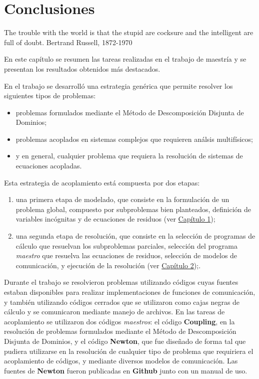 \chapter{Conclusiones}
\label{conclusiones}
\chapterquote
{The trouble with the world is that the stupid are cocksure and the intelligent are full of doubt.}
{Bertrand Russell, 1872-1970}

En este capítulo se resumen las tareas realizadas en el trabajo de maestría y se presentan los resultados obtenidos más destacados.

En el trabajo se desarrolló una estrategia genérica que permite resolver los siguientes tipos de problemas:
\begin{itemize}
\item problemas formulados mediante el Método de Descomposición Disjunta de Dominios;
\item problemas acoplados en sistemas complejos que requieren análsis multifísicos;
\item y en general, cualquier problema que requiera la resolución de sistemas de ecuaciones acopladas.
\end{itemize}
Esta estrategia de acoplamiento está compuesta por dos etapas:
\begin{enumerate}
\item una primera etapa de modelado, que consiste en la formulación de un problema global, compuesto por subproblemas bien planteados, definición de variables incógnitas y de ecuaciones de residuos (ver \hyperlink{chapter.1}{Capítulo 1});
\item una segunda etapa de resolución, que consiste en la selección de programas de cálculo que resuelvan los subproblemas parciales,
selección del programa \textit{maestro} que resuelva las ecuaciones de residuos, selección de modelos de comunicación, y ejecución de la resolución (ver \hyperlink{chapter.2}{Capítulo 2});.
\end{enumerate}

Durante el trabajo se resolvieron problemas utilizando códigos cuyas fuentes estaban disponibles para realizar implementaciones de funciones de comunicación,
y también utilizando códigos cerrados que se utilizaron como cajas negras de cálculo y se comunicaron mediante manejo de archivos.
En las tareas de acoplamiento se utilizaron dos códigos \textit{maestros}: el código \textbf{Coupling}, en la resolución de problemas formulados mediante el Método de Descomposición Disjunta de Dominios,
y el código \textbf{Newton}, que fue diseñado de forma tal que pudiera utilizarse en la resolución de cualquier tipo de problema que requiriera el acoplamiento de códigos,
y mediante diversos modelos de comunicación.
Las fuentes de \textbf{Newton} fueron publicadas en \textbf{Github} junto con un manual de uso.

